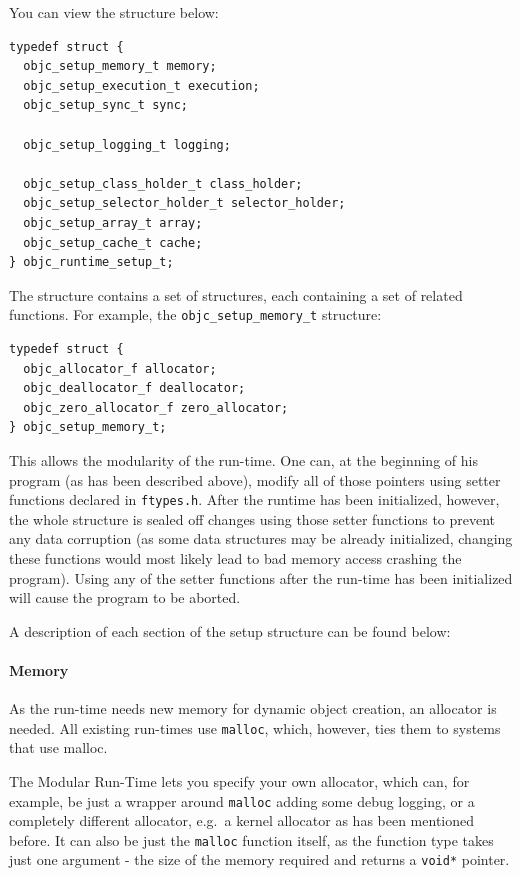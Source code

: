 You can view the structure below:

\begin{verbatim}
typedef struct {
  objc_setup_memory_t memory;
  objc_setup_execution_t execution;
  objc_setup_sync_t sync;
  
  objc_setup_logging_t logging;
  
  objc_setup_class_holder_t class_holder;
  objc_setup_selector_holder_t selector_holder;
  objc_setup_array_t array;
  objc_setup_cache_t cache;
} objc_runtime_setup_t;
\end{verbatim}

The structure contains a set of structures, each containing a set of related functions. For example, the \verb=objc_setup_memory_t= structure:

\begin{verbatim}
typedef struct {
  objc_allocator_f allocator;
  objc_deallocator_f deallocator;
  objc_zero_allocator_f zero_allocator;
} objc_setup_memory_t;
\end{verbatim}

This allows the modularity of the run-time. One can, at the beginning of his program (as has been described above), modify all of those pointers using setter functions declared in \verb=ftypes.h=. After the runtime has been initialized, however, the whole structure is sealed off changes using those setter functions to prevent any data corruption (as some data structures may be already initialized, changing these functions would most likely lead to bad memory access crashing the program). Using any of the setter functions after the run-time has been initialized will cause the program to be aborted.

A description of each section of the setup structure can be found below:

\paragraph{Memory}

As the run-time needs new memory for dynamic object creation, an allocator is needed. All existing run-times use \verb=malloc=, which, however, ties them to systems that use malloc.

The Modular Run-Time lets you specify your own allocator, which can, for example, be just a wrapper around \verb=malloc= adding some debug logging, or a completely different allocator, e.g.\ a kernel allocator as has been mentioned before. It can also be just the \verb=malloc= function itself, as the function type takes just one argument - the size of the memory required and returns a \verb=void*= pointer.

